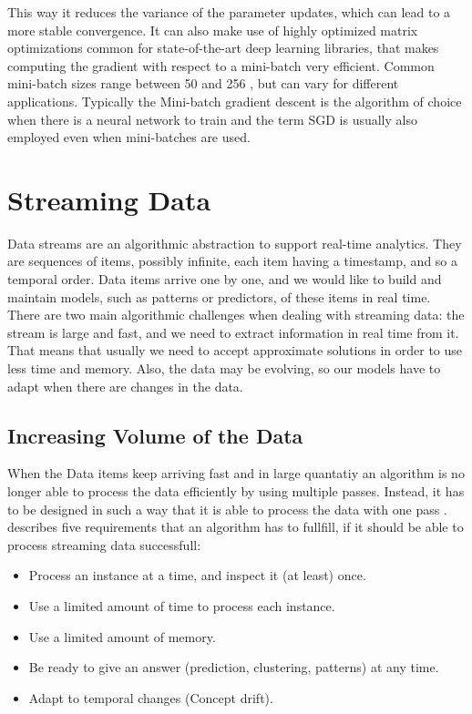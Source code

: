 \documentclass[12pt,oneside,a4paper,parskip]{scrbook}
\begin{document}
This way it reduces the variance of the parameter updates, which can lead to a more stable convergence.
It can also make use of highly optimized matrix optimizations common for state-of-the-art deep learning libraries,
that makes computing the gradient with respect to a mini-batch very efficient. 
Common mini-batch sizes range between 50 and 256 , but can vary for different applications. Typically the Mini-batch gradient descent is the 
algorithm of choice when there is a neural network to train and the term SGD is usually also employed even when mini-batches
are used. \cite{overvieDiffRSLVQ}

\pagebreak

\section{Streaming Data}

Data streams are an algorithmic abstraction to support real-time analytics. They are sequences of items, 
possibly infinite, each item having a timestamp, and so a temporal order. Data items arrive one by one, 
and we would like to build and maintain models, such as patterns or predictors, of these items in real time. 
There are two main algorithmic challenges when dealing with streaming data: the stream is large and fast, 
and we need to extract information in real time from it. That means that usually we need to accept approximate 
solutions in order to use less time and memory.
Also, the data may be evolving, so our models have to adapt when there are changes in the data. \cite{MLonDataStreams}

\subsection{Increasing Volume of the Data}
When the Data items keep arriving fast and in large quantatiy an algorithm is no longer able to process the data efficiently
by using multiple passes. Instead, it has to be designed in such a way that it is able to process the data with one pass \cite{aggarwal2007data}.
\cite{MLonDataStreams} describes five requirements that an algorithm has to fullfill, if it should be able to process streaming data successfull:

\begin{itemize}
  \item Process an instance at a time, and inspect it (at least) once.
  \item Use a limited amount of time to process each instance.
  \item Use a limited amount of memory.
  \item Be ready to give an answer (prediction, clustering, patterns) at any time.
  \item Adapt to temporal changes (Concept drift).
  \label{enum:5requ}
\end{itemize}
\end{document}
